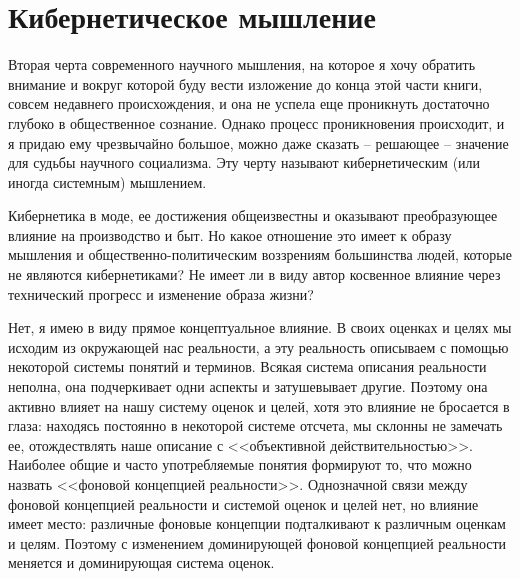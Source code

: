 \documentclass{book}
\begin{document}
\section{Кибернетическое мышление}

Вторая черта современного научного мышления, на которое я хочу обратить внимание и вокруг которой буду вести изло­жение до конца этой части книги, совсем недавнего происхождения, и она не успела еще проникнуть достаточно глубоко в общественное сознание. Однако процесс проникновения происходит, и я придаю ему чрезвычайно большое, можно даже сказать -- решающее -- значение для судьбы научного социа­лизма. Эту черту называют кибернетическим  (или иногда системным) мышлением. 

Кибернетика в моде, ее достижения общеизвестны и оказы­вают преобразующее влияние на производство и быт. Но какое отношение это имеет к образу мышления и общественно-поли­тическим воззрениям большинства людей, которые не являются кибернетиками? Не имеет ли в виду автор косвенное влияние через технический прогресс и изменение образа жизни?

Нет, я имею в виду прямое концептуальное влияние. В своих оценках и целях мы исходим из окружающей нас реальности, а эту реальность описываем с помощью некоторой системы по­нятий и терминов. Всякая система описания реальности непол­на, она подчеркивает одни аспекты и затушевывает другие. Поэтому она активно влияет на нашу систему оценок и целей, хотя это влияние не бросается в глаза: находясь постоянно в некоторой системе отсчета, мы склонны не замечать ее, отож­дествлять наше описание с <<объективной действительностью>>. Наиболее общие и часто употребляемые понятия формируют то, что можно назвать <<фоновой концепцией реальности>>. Одно­значной связи между фоновой концепцией реальности и систе­мой оценок и целей нет, но влияние имеет место: различные фоновые концепции подталкивают к различным оценкам и це­лям. Поэтому с изменением доминирующей фоновой концепцией реальности меняется и доминирующая система оценок.
\end{document}
